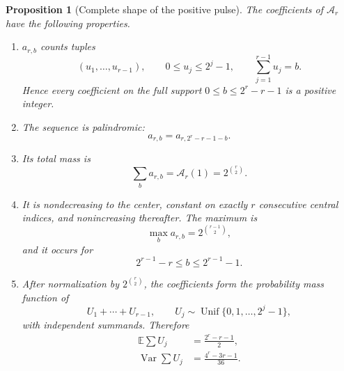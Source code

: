 \documentclass[11pt]{article}
\newtheorem{proposition}[theorem]{Proposition}
\theoremstyle{definition}
\theoremstyle{remark}
\newcommand{\A}{\mathcal A}
\begin{document}
\begin{proposition}[Complete shape of the positive pulse]\label{prop:pulse-shape}
The coefficients of \(\A_r\) have the following properties.

\begin{enumerate}[label=(\roman*),leftmargin=2.4em]
\item \(a_{r,b}\) counts tuples
\[
 (u_1,\ldots,u_{r-1}),\qquad
 0\leq u_j\leq2^j-1,\qquad \sum_{j=1}^{r-1}u_j=b.
\]
Hence every coefficient on the full support
\(0\leq b\leq2^r-r-1\) is a positive integer.

\item The sequence is palindromic:
\begin{equation}
 a_{r,b}=a_{r,2^r-r-1-b}.                                 \label{eq:pulse-pal}
\end{equation}

\item Its total mass is
\begin{equation}
 \sum_b a_{r,b}=\A_r(1)=2^{\binom r2}.                    \label{eq:pulse-mass}
\end{equation}

\item It is nondecreasing to the center, constant on exactly \(r\)
consecutive central indices, and nonincreasing thereafter.  The maximum is
\begin{equation}
 \max_b a_{r,b}=2^{\binom{r-1}{2}},                        \label{eq:pulse-peak}
\end{equation}
and it occurs for
\begin{equation}
 2^{r-1}-r\leq b\leq2^{r-1}-1.                            \label{eq:pulse-plateau}
\end{equation}

\item After normalization by \(2^{\binom r2}\), the coefficients form the
probability mass function of
\[
 U_1+\cdots+U_{r-1},
 \qquad U_j\sim\operatorname{Unif}\{0,1,\ldots,2^j-1\},
\]
with independent summands.  Therefore
\begin{align}
 \mathbb E\sum U_j&=\frac{2^r-r-1}{2},                    \label{eq:pulse-mean}\\
 \operatorname{Var}\sum U_j&=\frac{4^r-3r-1}{36}.         \label{eq:pulse-var}
\end{align}
\end{enumerate}
\end{proposition}
\end{document}
